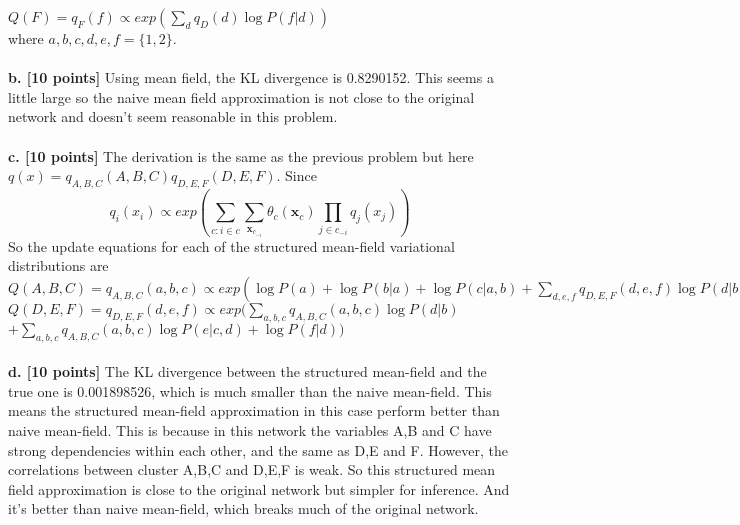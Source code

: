 \documentclass[letterpaper, 11pt]{article}
\begin{document}
$Q(F) = q_F(f) \propto exp( \sum_d q_D(d) \log P(f|d)  )$\\
where $a,b,c,d,e,f = \{1,2\}$.\\
\\
\textbf{b. [10 points]}
Using mean field, the KL divergence is 0.8290152. This seems a little large so the naive mean field approximation is not close to the original network and doesn't seem reasonable in this problem.\\
\\
\textbf{c. [10 points]}
The derivation is the same as the previous problem but here $q(x) = q_{A,B,C}(A,B,C)q_{D,E,F}(D,E,F)$. Since
$$q_i (x_i) \propto exp(\sum_{c:i \in c} \sum_{\mathbf{x}_{c_{-i}}} \theta_{c} (\mathbf{x}_c) \prod_{j \in c_{-i}} q_j (x_j))$$
So the update equations for each of the structured mean-field variational distributions are\\
$Q(A,B,C) = q_{A,B,C}(a,b,c) \propto exp( \log P(a) + \log P(b|a) + \log P(c|a,b) + \sum_{d,e,f} q_{D,E,F}(d,e,f) \log P(d|b) + \sum_{d,e,f} q_{D,E,F}(d,e,f) \log P(e|c,d)  )$\\
$Q(D,E,F) = q_{D,E,F}(d,e,f) \propto exp( \sum_{a,b,c} q_{A,B,C}(a,b,c) \log P(d|b) $ \\
$+ \sum_{a,b,c} q_{A,B,C}(a,b,c) \log P(e|c,d) +  \log P(f|d)  )$\\
\\
\textbf{d. [10 points]}
The KL divergence between the structured mean-field and the true one is 0.001898526, which is much smaller than the naive mean-field. This means the structured mean-field approximation in this case perform better than naive mean-field. This is because in this network the variables A,B and C have strong dependencies within each other, and the same as D,E and F. However, the correlations between cluster A,B,C and D,E,F is weak. So this structured mean field approximation is close to the original network but simpler for inference. And it's better than naive mean-field, which breaks much of the original network.
\end{document}

